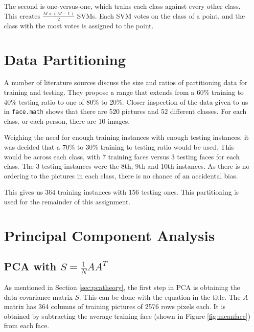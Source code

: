 \documentclass[a4paper, 10pt, conference]{ieeeconf}
\begin{document}
The second is one-versus-one, which trains each class against every other class. This creates $\frac{M \times (M-1)}{2}$ SVMs. Each SVM votes on the class of a point, and the class with the most votes is assigned to the point.

%
\section{Data Partitioning}
A number of literature sources discuss the size and ratios of partitioning data for training and testing. They propose a range that extends from a 60\% training to 40\% testing ratio to one of 80\% to 20\%. Closer inspection of the data given to us in \texttt{face.math} shows that there are 520 pictures and 52 different classes. For each class, or each person, there are 10 images.

Weighing the need for enough training instances with enough testing instances, it was decided that a 70\% to 30\% training to testing ratio would be used. This would be across each class, with 7 training faces versus 3 testing faces for each class. The 3 testing instances were the 8th, 9th and 10th instances. As there is no ordering to the pictures in each class, there is no chance of an accidental bias.

This gives us 364 training instances with 156 testing ones. This partitioning is used for the remainder of this assignment.

\section{Principal Component Analysis}


\subsection{PCA with $S = \frac{1}{N}AA^{T}$}
As mentioned in Section \ref{sec:pcatheory}, the first step in PCA is obtaining the data covariance matrix $S$. This can be done with the equation in the title. The $A$ matrix has 364 columns of training pictures of 2576 rows pixels each. It is obtained by subtracting the average training face (shown in Figure \ref{fig:meanface}) from each face.
\end{document}
